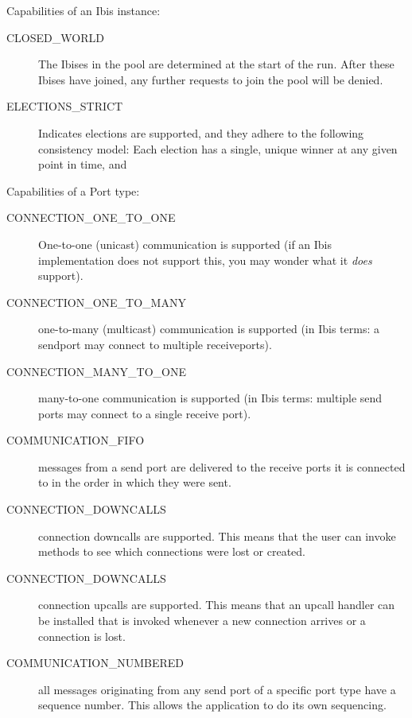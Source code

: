\documentclass[10pt]{article}
\begin{document}
Capabilities of an Ibis instance:

\begin{description}

\item[CLOSED\_WORLD]
The Ibises in the pool are determined at the start of the
run. After these Ibises have joined, any further requests to join the
pool will be denied.

\item[ELECTIONS\_STRICT]
Indicates elections are supported, and they adhere to the following 
consistency model: Each election has a single, unique winner at any
given point in time, and


\end{description}

Capabilities of a Port type:

\begin{description}
\item[CONNECTION\_ONE\_TO\_ONE]
One-to-one (unicast) communication is supported (if an Ibis
implementation
does not support this, you may wonder what it \emph{does} support).

\item[CONNECTION\_ONE\_TO\_MANY]
one-to-many (multicast) communication is supported
(in Ibis terms: a sendport
may connect to multiple receiveports).

\item[CONNECTION\_MANY\_TO\_ONE]
many-to-one communication is supported (in Ibis terms: multiple
send ports may connect to a single receive port).

\item[COMMUNICATION\_FIFO]
messages from a send port are delivered to the receive ports it is
connected to in the order in which they were sent.

\item[CONNECTION\_DOWNCALLS]
connection downcalls are supported. This means that the user can
invoke methods to see which connections were lost or created.

\item[CONNECTION\_DOWNCALLS]
connection upcalls are supported. This means that an upcall
handler can be installed that is invoked whenever a new connection
arrives
or a connection is lost.

\item[COMMUNICATION\_NUMBERED]
all messages originating from any send port of a specific port type have
a sequence number. This allows the application to do its own sequencing.


\end{description}
\end{document}
